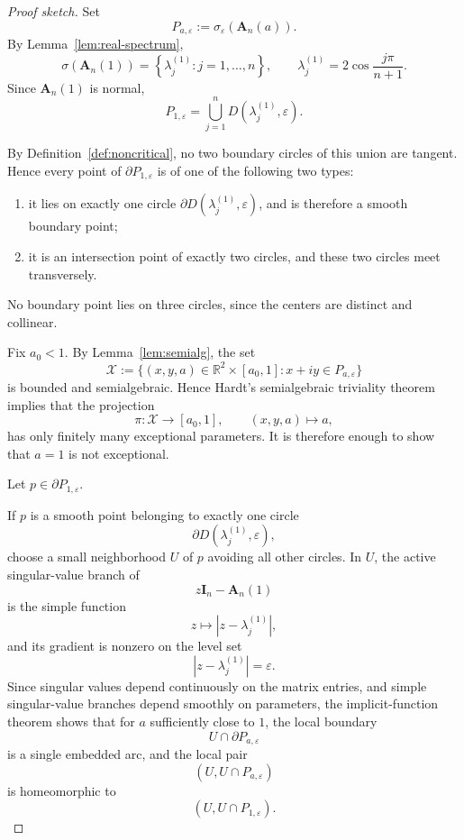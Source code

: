 \documentclass[11pt]{article}
\newcommand{\R}{\mathbb{R}}
\begin{document}
\begin{proof}[Proof sketch]
Set
\[
P_{a,\varepsilon}:=\sigma_\varepsilon(\mathbf A_n(a)).
\]
By Lemma~\ref{lem:real-spectrum},
\[
\sigma(\mathbf A_n(1))
=
\left\{
\lambda_j^{(1)}:j=1,\dots,n
\right\},
\qquad
\lambda_j^{(1)}=2\cos\frac{j\pi}{n+1}.
\]
Since \(\mathbf A_n(1)\) is normal,
\[
P_{1,\varepsilon}
=
\bigcup_{j=1}^n D(\lambda_j^{(1)},\varepsilon).
\]

By Definition~\ref{def:noncritical}, no two boundary circles of this union are tangent. Hence every point of \(\partial P_{1,\varepsilon}\) is of one of the following two types:

\begin{enumerate}
\item it lies on exactly one circle \(\partial D(\lambda_j^{(1)},\varepsilon)\), and is therefore a smooth boundary point;
\item it is an intersection point of exactly two circles, and these two circles meet transversely.
\end{enumerate}

No boundary point lies on three circles, since the centers are distinct and collinear.

Fix \(a_0<1\). By Lemma~\ref{lem:semialg}, the set
\[
\mathcal X
:=
\{(x,y,a)\in \R^2\times[a_0,1]:x+iy\in P_{a,\varepsilon}\}
\]
is bounded and semialgebraic. Hence Hardt's semialgebraic triviality theorem
\cite[Ch.~9]{BCR} implies that the projection
\[
\pi:\mathcal X\to[a_0,1],\qquad (x,y,a)\mapsto a,
\]
has only finitely many exceptional parameters. It is therefore enough to show that \(a=1\) is not exceptional.

Let \(p\in\partial P_{1,\varepsilon}\).

If \(p\) is a smooth point belonging to exactly one circle
\[
\partial D(\lambda_j^{(1)},\varepsilon),
\]
choose a small neighborhood \(U\) of \(p\) avoiding all other circles. In \(U\), the active singular-value branch of
\[
z\mathbf I_n-\mathbf A_n(1)
\]
is the simple function
\[
z\longmapsto |z-\lambda_j^{(1)}|,
\]
and its gradient is nonzero on the level set
\[
|z-\lambda_j^{(1)}|=\varepsilon.
\]
Since singular values depend continuously on the matrix entries, and simple singular-value branches depend smoothly on parameters, the implicit-function theorem shows that for \(a\) sufficiently close to \(1\), the local boundary
\[
U\cap\partial P_{a,\varepsilon}
\]
is a single embedded arc, and the local pair
\[
(U,U\cap P_{a,\varepsilon})
\]
is homeomorphic to
\[
(U,U\cap P_{1,\varepsilon}).
\]


\end{proof}
\end{document}

